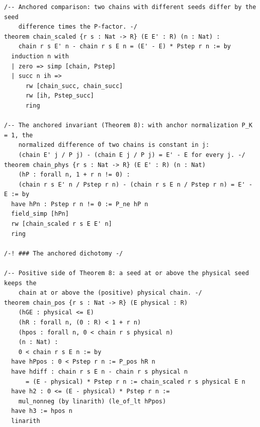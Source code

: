 \documentclass[11pt]{article}
\theoremstyle{remark}
\begin{document}
\begin{verbatim}
/-- Anchored comparison: two chains with different seeds differ by the seed
    difference times the P-factor. -/
theorem chain_scaled {r s : Nat -> R} (E E' : R) (n : Nat) :
    chain r s E' n - chain r s E n = (E' - E) * Pstep r n := by
  induction n with
  | zero => simp [chain, Pstep]
  | succ n ih =>
      rw [chain_succ, chain_succ]
      rw [ih, Pstep_succ]
      ring

/-- The anchored invariant (Theorem 8): with anchor normalization P_K = 1, the
    normalized difference of two chains is constant in j:
    (chain E' j / P j) - (chain E j / P j) = E' - E for every j. -/
theorem chain_phys {r s : Nat -> R} (E E' : R) (n : Nat)
    (hP : forall n, 1 + r n != 0) :
    (chain r s E' n / Pstep r n) - (chain r s E n / Pstep r n) = E' - E := by
  have hPn : Pstep r n != 0 := P_ne hP n
  field_simp [hPn]
  rw [chain_scaled r s E E' n]
  ring

/-! ### The anchored dichotomy -/

/-- Positive side of Theorem 8: a seed at or above the physical seed keeps the
    chain at or above the (positive) physical chain. -/
theorem chain_pos {r s : Nat -> R} (E physical : R)
    (hGE : physical <= E)
    (hR : forall n, (0 : R) < 1 + r n)
    (hpos : forall n, 0 < chain r s physical n)
    (n : Nat) :
    0 < chain r s E n := by
  have hPpos : 0 < Pstep r n := P_pos hR n
  have hdiff : chain r s E n - chain r s physical n
      = (E - physical) * Pstep r n := chain_scaled r s physical E n
  have h2 : 0 <= (E - physical) * Pstep r n :=
    mul_nonneg (by linarith) (le_of_lt hPpos)
  have h3 := hpos n
  linarith


\end{verbatim}
\end{document}

